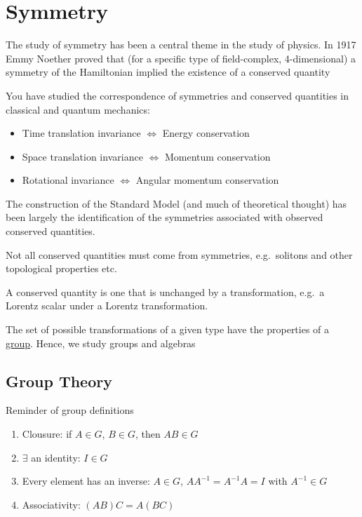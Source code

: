 \newcommand{\up}{\uparrow}
\newcommand{\dn}{\downarrow}
\section{Symmetry}
The study of symmetry has been a central theme in the study of physics. In 1917 Emmy Noether proved that (for a specific type of field-complex, 4-dimensional) a symmetry of the Hamiltonian implied the existence of a conserved quantity

You have studied the correspondence of symmetries and conserved quantities in classical and quantum mechanics:
\begin{itemize}
\item Time translation invariance $\iff$ Energy conservation
\item Space translation invariance $\iff$ Momentum conservation
\item Rotational invariance $\iff$ Angular momentum conservation
\end{itemize}

The construction of the Standard Model (and much of theoretical thought) has been largely the identification of the symmetries associated with observed conserved quantities.

\begin{aside}
  Not all conserved quantities must come from symmetries, e.g.\ solitons and other topological properties etc.
\end{aside}

A conserved quantity is one that is unchanged by a transformation, e.g.\ a Lorentz scalar under a Lorentz transformation.

The set of possible transformations of a given type have the properties of a \underline{group}. Hence, we study groups and algebras

\subsection{Group Theory}
Reminder of group definitions
\begin{enumerate}
\item Clousure: if $A\in G$, $B\in G$, then $AB\in G$
\item $\exists$ an identity: $I\in G$
\item Every element has an inverse: $A\in G$, $AA^{-1}=A^{-1}A=I$ with $A^{-1}\in G$
\item Associativity: $(AB)C=A(BC)$
\end{enumerate}

